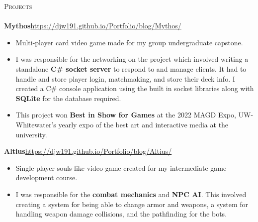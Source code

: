 \documentclass[letter, 12pt]{article}
\newcommand{\lineunder} {
    \vspace*{-8pt} \\
    \hspace*{-18pt} \hrulefill \\
}
\newcommand{\header} [1] {
    {\hspace*{-18pt}\vspace*{6pt} \textsc{#1}}
    \vspace*{-6pt} \lineunder
}
\begin{document}
\header{Projects}
{\textbf{Mythos}}\hfill \url{https://djw191.github.io/Portfolio/blog/Mythos/}\\
\begin{itemize} \itemsep 1pt
	\item Multi-player card video game made for my group undergraduate capstone.
	\item I was responsible for the networking on the project which involved writing a standalone \textbf{C\# socket server} to respond to and manage clients. It had to handle and store player login, matchmaking, and store their deck info. I created a C\# console application using the built in socket libraries along with \textbf{SQLite} for the database required.\\
	\item This project won \textbf{Best in Show for Games} at the 2022 MAGD Expo, UW-Whitewater's yearly expo of the best art and interactive media at the university.
\end{itemize}
\vspace*{2mm}
{\textbf{Altius}}\hfill \url{https://djw191.github.io/Portfolio/blog/Altius/}\\
\begin{itemize} \itemsep 1pt
	\item Single-player souls-like video game created for my intermediate game development course. \\
	\item I was responsible for the \textbf{combat mechanics} and \textbf{NPC AI}. This involved creating a system for being able to change armor and weapons, a system for handling weapon damage collisions, and the pathfinding for the bots.\\
\end{itemize}
\vspace*{2mm}

\ 
\end{document}
